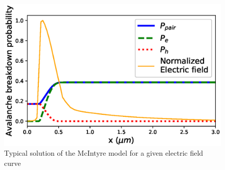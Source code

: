 \documentclass[10pt,a4paper,twocolumn]{article}
\begin{document}
\begin{figure}[hbtp]
\centering
\includegraphics[scale=0.65]{../pictures/PlotStreamline_1_.eps}
\caption{Typical solution of the McIntyre model for a given electric field curve}
\label{fig:BrPOnLine}
\end{figure}
\end{document}
